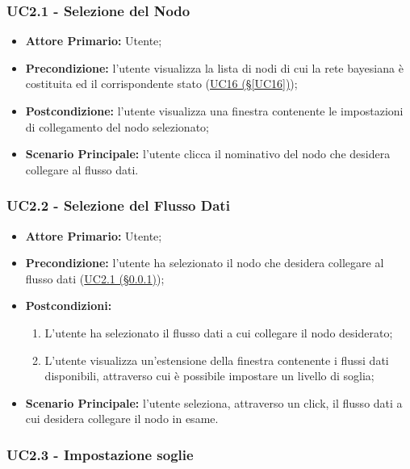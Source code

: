\subsubsection{UC2.1 - Selezione del Nodo}\label{UC2.1}
\begin{itemize}
\item \textbf{Attore Primario:} Utente;
\item \textbf{Precondizione:} l'utente visualizza la lista di nodi di cui la rete bayesiana è costituita ed il 	corrispondente stato (\hyperref[UC16]{UC16 (§\ref*{UC16})});
\item \textbf{Postcondizione:} l'utente visualizza una finestra contenente le impostazioni di collegamento del nodo selezionato;
\item \textbf{Scenario Principale:} l'utente clicca il nominativo del nodo che desidera collegare al flusso dati.
\end{itemize}

\subsubsection{UC2.2 - Selezione del Flusso Dati}\label{UC2.2}
\begin{itemize}
\item \textbf{Attore Primario:} Utente;
\item \textbf{Precondizione:} l'utente ha selezionato il nodo che desidera collegare al flusso dati 					(\hyperref[UC2.1]{UC2.1 (§\ref*{UC2.1})});
\item \textbf{Postcondizioni:}
	\begin{enumerate}
	\item L'utente ha selezionato il flusso dati a cui collegare il nodo desiderato;
	\item L'utente visualizza un'estensione della finestra contenente i flussi dati disponibili, attraverso cui è 					possibile impostare un livello di soglia;
	\end{enumerate}
\item \textbf{Scenario Principale:} l'utente seleziona, attraverso un click, il flusso dati a cui desidera 						collegare il nodo in esame.
\end{itemize}

\pagebreak

\subsubsection{UC2.3 - Impostazione soglie}\label{UC2.3}

